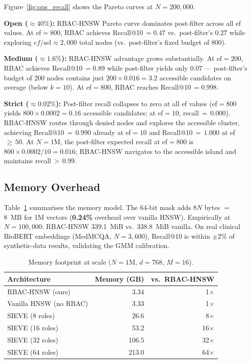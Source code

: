 Figure~\ref{fig:qps_recall} shows the Pareto curves at $N\!=\!200{,}000$.

\textbf{Open (${\approx}40\%$):}
RBAC-HNSW Pareto curve dominates post-filter across all ef values.
At ef$\!=\!800$, RBAC achieves Recall@10\,$=\!0.47$ vs.\ post-filter's $0.27$
while exploring $\mathit{ef}/\text{sel}\!\approx\!2{,}000$ total nodes
(vs.\ post-filter's fixed budget of 800).

\textbf{Medium (${\approx}1.6\%$):}
RBAC-HNSW advantage grows substantially.
At ef$\!=\!200$, RBAC achieves Recall@10\,$=\!0.89$ while post-filter yields
only $0.07$ --- post-filter's budget of 200 nodes contains just
$200\!\times\!0.016\!=\!3.2$ accessible candidates on average (below $k\!=\!10$).
At ef$\!=\!800$, RBAC reaches Recall@10\,$=\!0.998$.

\textbf{Strict (${\approx}0.02\%$):}
Post-filter recall collapses to zero at all ef values
(ef$\!=\!800$ yields $800\!\times\!0.0002\!=\!0.16$ accessible candidates;
at ef$\!=\!10$, recall$\,{=}\,0.000$).
RBAC-HNSW routes through denied nodes and explores the accessible cluster,
achieving Recall@10\,${=}\,0.990$ already at ef$\!=\!10$ and
Recall@10\,${=}\,1.000$ at ef$\,{\geq}\,50$.
At $N\!=\!1$M, the post-filter expected recall at ef$\!=\!800$ is
$800\!\times\!0.0002/10\!=\!0.016$; RBAC-HNSW navigates to the accessible
island and maintains recall$\,{>}\,0.99$.

\subsection{Memory Overhead}
\label{sec:memory}

Table~\ref{tab:memory} summarises the memory model.
The 64-bit mask adds $8N$ bytes $=$ 8~MB for 1M vectors
(\textbf{0.24\%} overhead over vanilla HNSW).
Empirically at $N\!=\!100{,}000$: RBAC-HNSW 339.1~MiB vs.\ 338.8~MiB vanilla.
On real clinical BioBERT embeddings (MedMCQA, $N\!=\!3{,}600$), Recall@10 is
within $\pm 2\%$ of synthetic-data results, validating the GMM calibration.

\begin{table}[h]
\centering
\small
\setlength{\tabcolsep}{4pt}
\caption{Memory footprint at scale ($N\!=\!1$M, $d\!=\!768$, $M\!=\!16$).}
\label{tab:memory}
\begin{tabular}{lrr}
\toprule
\textbf{Architecture} & \textbf{Memory (GB)} & \textbf{vs.\ RBAC-HNSW} \\
\midrule
RBAC-HNSW (ours)       &   3.34 & 1$\times$ \\
Vanilla HNSW (no RBAC) &   3.33 & 1$\times$ \\
\midrule
SIEVE (8 roles)        &  26.6  & 8$\times$ \\
SIEVE (16 roles)       &  53.2  & 16$\times$ \\
SIEVE (32 roles)       & 106.5  & 32$\times$ \\
SIEVE (64 roles)       & 213.0  & 64$\times$ \\
\bottomrule
\end{tabular}
\end{table}
